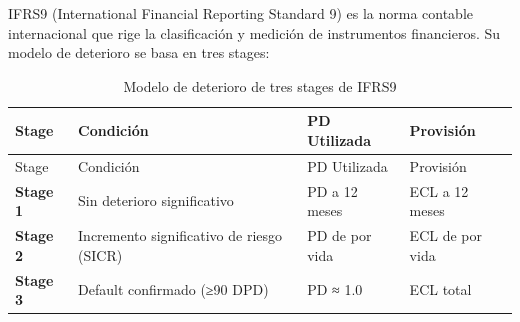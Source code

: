 \documentclass[
  spanish,
  11pt,
  letterpaper,
]{scrbook}
\theoremstyle{plain}
\theoremstyle{remark}
\begin{document}
IFRS9 (International Financial Reporting Standard 9) es la norma
contable internacional que rige la clasificación y medición de
instrumentos financieros. Su modelo de deterioro se basa en tres stages:

\begin{longtable}[]{@{}
  >{\raggedright\arraybackslash}p{}
  >{\raggedright\arraybackslash}p{}
  >{\raggedright\arraybackslash}p{}
  >{\raggedright\arraybackslash}p{}@{}}
\caption{Modelo de deterioro de tres stages de
IFRS9}\label{tbl-ifrs9-stages}\tabularnewline
\toprule\noalign{}
\begin{minipage}[b]{\linewidth}\raggedright
Stage
\end{minipage} & \begin{minipage}[b]{\linewidth}\raggedright
Condición
\end{minipage} & \begin{minipage}[b]{\linewidth}\raggedright
PD Utilizada
\end{minipage} & \begin{minipage}[b]{\linewidth}\raggedright
Provisión
\end{minipage} \\
\midrule\noalign{}
\endfirsthead
\toprule\noalign{}
\begin{minipage}[b]{\linewidth}\raggedright
Stage
\end{minipage} & \begin{minipage}[b]{\linewidth}\raggedright
Condición
\end{minipage} & \begin{minipage}[b]{\linewidth}\raggedright
PD Utilizada
\end{minipage} & \begin{minipage}[b]{\linewidth}\raggedright
Provisión
\end{minipage} \\
\midrule\noalign{}
\endhead
\bottomrule\noalign{}
\endlastfoot
\textbf{Stage 1} & Sin deterioro significativo & PD a 12 meses & ECL a
12 meses \\
\textbf{Stage 2} & Incremento significativo de riesgo (SICR) & PD de por
vida & ECL de por vida \\
\textbf{Stage 3} & Default confirmado (≥90 DPD) & PD ≈ 1.0 & ECL
total \\
\end{longtable}
\end{document}
